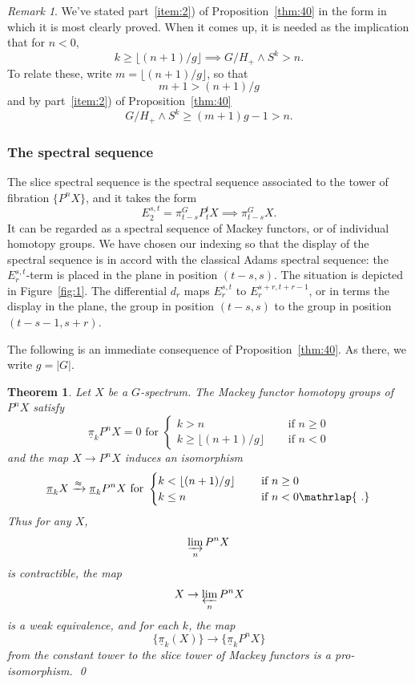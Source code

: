 \documentclass{amsart}
\newtheorem{thm}[equation]{Theorem}
\newtheorem{rem}[equation]{Remark}
\theoremstyle{definition}
\theoremstyle{remark}
\newtheorem{rem}[equation]{Remark}
\newcounter{thmItem}
\newcommand{\thmItemref}[1]
 	 {{\rm \ref{#1})}}
\newcommand{\slc}[2]{P_{#1}^{#1}#2}
\newcommand{\pim}{\underline{\pi}}
\begin{document}
\begin{rem}
We've stated part~\thmItemref{item:2} of Proposition~\ref{thm:40} in
the form in which it is most clearly proved.  When it comes up, it is
needed as the implication that for $n<0$,
\[
k \ge \lfloor (n+1)/g \rfloor \implies G/H_{+}\wedge S^{k} > n.
\]
To relate these, write $m=\lfloor (n+1)/g \rfloor$, so that
\[
m+1 > (n+1)/g
\]
and by part~\thmItemref{item:2} of Proposition~\ref{thm:40}
\[
G/H_{+}\wedge S^{k} \ge (m+1)g-1 > n.
\]
\end{rem}

\subsubsection{The spectral sequence}
\label{sec:spectral-sequence}

The slice spectral sequence is the spectral sequence associated to the
tower of fibration $\{P^{n}X \}$, and it takes the form
\[
E_{2}^{s,t}=\pi_{t-s}^{G}\slc{t}{X}\implies \pi_{t-s}^{G}X.
\]
It can be regarded as a spectral sequence of Mackey functors, or of
individual homotopy groups.  We have chosen our indexing so that the
display of the spectral sequence is in accord with the classical Adams
spectral sequence: the $E_{r}^{s,t}$-term is placed in the plane in
position $(t-s,s)$.  The situation is depicted in Figure~\ref{fig:1}.
The differential $d_{r}$ maps $E_{r}^{s,t}$ to $E_{r}^{s+r, t+r-1}$,
or in terms the display in the plane, the group in position $(t-s,s)$
to the group in position $(t-s-1,s+r)$.

The following is an immediate consequence of Proposition~\ref{thm:40}.
As there, we write $g=|G|$.

\begin{thm}
\label{thm:34} Let $X$ be a $G$-spectrum.  The
Mackey functor homotopy groups of $P^{n}X$ satisfy
\[
\pim_{k}P^{n}X = 0\text{ for }
\begin{cases}
k>n &\quad \text{ if }n\ge 0 \\
k \ge \lfloor (n+1)/g\rfloor &\quad \text{ if }n < 0
\end{cases}
\]
and the map $X\to P^{n}X$ induces an isomorphism
\[
\pim_{k}X\xrightarrow{\approx}{} \pim_{k}P^{n}X\text{ for }
\begin{cases}
k<\lfloor (n+1)/g \rfloor &\quad \text{ if }n\ge 0 \\
k \le n &\quad \text{ if }n < 0\mathrlap{\ .}
\end{cases}
\]
Thus for any $X$,
\[
\varinjlim_{n} P^{n}X
\]
is contractible, the map
\[
X\to \varprojlim_{n} P^{n}X
\]
is a weak equivalence, and for each $k$, the map
\[
\{\pim_{k}(X) \}\to \{\pim_{k}P^{n}X \}
\]
from the constant tower to the slice tower of Mackey functors
is a pro-isomorphism. \qed
\end{thm}
\end{document}

